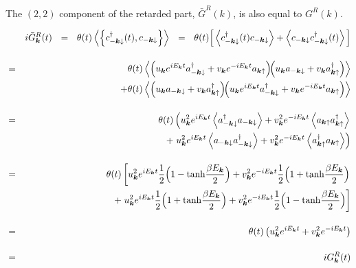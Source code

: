 \documentclass[uplatex,a4j,12pt,dvipdfmx]{jsarticle}
\begin{document}
The $(2,2)$ component of the retarded part, $\bar{G}^{R}(k)$, is also equal to $G^{R}(k)$.

\begin{eqnarray}
	&&
	i
	\bar{G}_{\bm{k}}^{R}(t)
	\ \ = \ \
	\theta(t)
	\left\langle \left\{
	c_{-\bm{k} \downarrow}^{\dagger}(t), c_{-\bm{k} \downarrow}
	\right\} \right\rangle
	\ \ = \ \
	\theta(t)
	\Big[
		\left\langle
		c_{-\bm{k} \downarrow}^{\dagger}(t) c_{-\bm{k} \downarrow}
		\right\rangle
		+
		\left\langle
		c_{-\bm{k} \downarrow} c_{-\bm{k} \downarrow}^{\dagger}(t)
		\right\rangle
		\Big]
	\nonumber \\[4mm] &=&
	\theta(t)
	\left\langle
	\left(
	u_{\bm{k}} e^{ i E_{\bm{k}} t }
	a_{-\bm{k} \downarrow}^{\dagger}
	+
	v_{\bm{k}} e^{ - i E_{\bm{k}} t }
	a_{\bm{k} \uparrow}
	\right)
	\!\!
	\left(
	u_{\bm{k}}
	a_{-\bm{k} \downarrow}
	+
	v_{\bm{k}}
	a_{\bm{k} \uparrow}^{\dagger}
	\right)
	\right\rangle
	\nonumber \\ && \hspace{5mm} +
	\theta(t)
	\left\langle
	\left(
	u_{\bm{k}}
	a_{-\bm{k} \downarrow}
	+
	v_{\bm{k}}
	a_{\bm{k} \uparrow}^{\dagger}
	\right)
	\!\!
	\left(
	u_{\bm{k}} e^{ i E_{\bm{k}} t }
	a_{-\bm{k} \downarrow}^{\dagger}
	+
	v_{\bm{k}} e^{ - i E_{\bm{k}} t }
	a_{\bm{k} \uparrow}
	\right)
	\right\rangle
	\nonumber \\[4mm]
	&=&
	\theta(t)
	\left(
	u_{\bm{k}}^{2}
	e^{ i E_{\bm{k}} t }
	\left\langle
	a_{-\bm{k} \downarrow}^{\dagger}
	a_{-\bm{k} \downarrow}
	\right\rangle
	+
	v_{\bm{k}}^{2}
	e^{ - i E_{\bm{k}} t }
	\left\langle
	a_{\bm{k} \uparrow}
	a_{\bm{k} \uparrow}^{\dagger}
	\right\rangle
	\right.
	\nonumber \\ && \hspace{5mm} +
	\left.
	u_{\bm{k}}^{2}
	e^{ i E_{\bm{k}} t }
	\left\langle
	a_{-\bm{k} \downarrow}
	a_{-\bm{k} \downarrow}^{\dagger}
	\right\rangle
	+
	v_{\bm{k}}^{2}
	e^{ - i E_{\bm{k}} t }
	\left\langle
	a_{\bm{k} \uparrow}^{\dagger}
	a_{\bm{k} \uparrow}
	\right\rangle
	\right)
	\nonumber \\[4mm]
	&=&
	\theta(t)
	\left[
		u_{\bm{k}}^{2}
		e^{ i E_{\bm{k}} t }
		\dfrac{1}{2}
		\Big( 1 - {\rm tanh}\dfrac{\beta E_{\bm{k}}}{2} \Big)
		+
		v_{\bm{k}}^{2}
		e^{ - i E_{\bm{k}} t }
		\dfrac{1}{2}
		\Big( 1 + {\rm tanh}\dfrac{\beta E_{\bm{k}}}{2} \Big)
		\right.
		\nonumber \\ && \hspace{5mm} +
		\left.
		u_{\bm{k}}^{2}
		e^{ i E_{\bm{k}} t }
		\dfrac{1}{2}
		\Big( 1 + {\rm tanh}\dfrac{\beta E_{\bm{k}}}{2} \Big)
		+
		v_{\bm{k}}^{2}
		e^{ - i E_{\bm{k}} t }
		\dfrac{1}{2}
		\Big( 1 - {\rm tanh}\dfrac{\beta E_{\bm{k}}}{2} \Big)
		\right]
	\nonumber \\[4mm] &=&
	\theta(t)
	\left(
	u_{\bm{k}}^{2}
	e^{ i E_{\bm{k}} t }
	+
	v_{\bm{k}}^{2}
	e^{ - i E_{\bm{k}} t }
	\right)
	\nonumber \\[4mm] &=&
	i
	G_{\bm{k}}^{R}(t)
\end{eqnarray}
\end{document}

